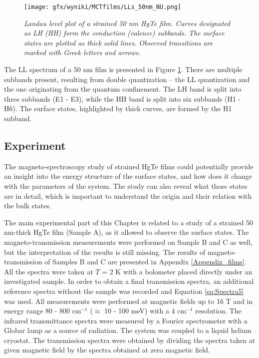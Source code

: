 \documentclass[titlepage,a4paper]{book}
\newcommand{\wciecie}{\quad\phantom{v}}
\begin{document}
\begin{figure}[H]
	\centering
	\texttt{[image: gfx/wyniki/MCTfilms/LLs\_50nm\_NU.png]}
	\vspace{-10pt}
	\caption{\textit{Landau level plot of a strained 50 nm HgTe film. Curves designated as LH (HH) form the conduction (valence) subbands. The surface states are plotted as thick solid lines. Observed transitions are marked with Greek letters and arrows.}}
	\label{fig:LL_50nm}
\end{figure} 

The LL spectrum of a 50 nm film is presented in Figure \ref{fig:LL_50nm}. There are multiple subbands present, resulting from double quantization -- the LL quantization and the one originating from the quantum confinement. The LH band is split into three subbands (E1 - E3), while the HH band is split into six subbands (H1 - H6). The surface states, highlighted by thick curves, are formed by the H1 subband. 


\subsection{Experiment}
\wciecie
The magneto-spectroscopy study of strained HgTe films could potentially provide an insight into the energy structure of the surface states, and how does it change with the parameters of the system. The study can also reveal what those states are in detail, which is important to understand the origin and their relation with the bulk states.

The main experimental part of this Chapter is related to a study of a strained 50 nm-thick HgTe film (Sample A), as it allowed to observe the surface states. The magneto-transmission measurements were performed on Sample B and C as well, but the interpretation of the results is still missing. The results of magneto-transmission of Samples B and C are presented in Appendix \ref{Appendix_films}. All the spectra were taken at $T$ = 2 K with a bolometer placed directly under an investigated sample. In order to obtain a final transmission spectra, an additional reference spectra without the sample was recorded and Equation \ref{eq:Spectra5} was used. All measurements were performed at magnetic fields up to 16 T and in energy range 80 - 800 cm$^{-1}$ ($\approx$ 10 - 100 meV) with a 4 cm$^{-1}$ resolution. The infrared transmittance spectra were measured by a Fourier spectrometer with a Globar lamp as a source of radiation. The system was coupled to a liquid helium cryostat. The transmission spectra were obtained by dividing the spectra taken at given magnetic field by the spectra obtained at zero magnetic field.
\end{document}
